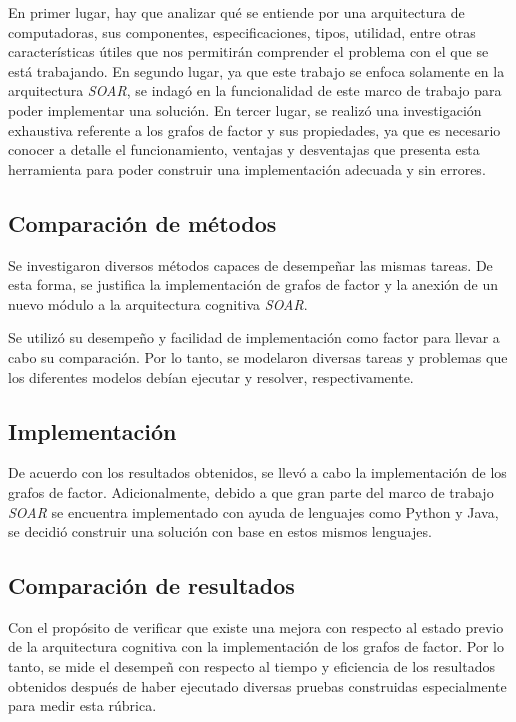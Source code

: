  En primer lugar, hay que analizar qu\'{e} se entiende por una arquitectura de computadoras, sus componentes, especificaciones, tipos, utilidad, entre otras caracter\'{i}sticas \'{u}tiles que nos permitir\'{a}n comprender el problema con el que se est\'{a} trabajando. En segundo lugar, ya que este trabajo se enfoca solamente en la arquitectura \emph{SOAR}, se indag\'{o} en la funcionalidad de este marco de trabajo para poder implementar una soluci\'{o}n. En tercer lugar, se realiz\'{o} una investigaci\'{o}n exhaustiva referente a los grafos de factor y sus propiedades, ya que es necesario conocer a detalle el funcionamiento, ventajas y desventajas que presenta esta herramienta para poder construir una implementaci\'{o}n adecuada y sin errores.
 
 \subsection{Comparaci\'{o}n de m\'{e}todos}
 
 Se investigaron diversos m\'{e}todos capaces de desempe\~nar las mismas tareas. De esta forma, se justifica la implementaci\'{o}n de grafos de factor y la anexi\'{o}n de un nuevo m\'{o}dulo a la arquitectura cognitiva \emph{SOAR}.
 
 Se utiliz\'{o} su desempe\~no y facilidad de implementaci\'{o}n como factor para llevar a cabo su comparaci\'{o}n. Por lo tanto, se modelaron diversas tareas y problemas que los diferentes modelos deb\'{i}an ejecutar y resolver, respectivamente.
 
 \subsection{Implementaci\'{o}n}
 
 De acuerdo con los resultados obtenidos, se llev\'{o} a cabo la implementaci\'{o}n de los grafos de factor. Adicionalmente, debido a que gran parte del marco de trabajo \emph{SOAR} se encuentra implementado con ayuda de lenguajes como Python y Java, se decidi\'{o} construir una soluci\'{o}n con base en estos mismos lenguajes. 
 
 \subsection{Comparaci\'{o}n de resultados}
 
 Con el prop\'{o}sito de verificar que existe una mejora con respecto al estado previo de la arquitectura cognitiva con la implementaci\'{o}n de los grafos de factor. Por lo tanto, se mide el desempe\~n con respecto al tiempo y eficiencia de los resultados obtenidos despu\'{e}s de haber ejecutado diversas pruebas construidas especialmente para medir esta r\'{u}brica.
 
  